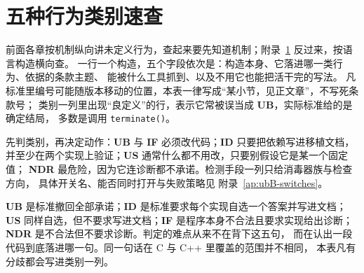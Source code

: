 \documentclass[12pt,a4paper,fontset=fandol]{ctexbook}
\newcommand{\Fn}[1]{\texttt{#1()}}
\newcommand{\Lang}[1]{\textsf{#1}}
\newcommand{\CL}{\Lang{C}}
\newcommand{\CPP}{\Lang{C++}}
\newcommand{\UB}{\textbf{\textsf{UB}}}
\newcommand{\IDB}{\textbf{\textsf{ID}}}
\newcommand{\USB}{\textbf{\textsf{US}}}
\newcommand{\NDR}{\textbf{\textsf{NDR}}}
\newcommand{\ILLF}{\textbf{\textsf{IF}}}
\begin{document}
\appendix
\chapter{五种行为类别速查}\label{ap:ubA-kinds}

前面各章按机制纵向讲未定义行为，查起来要先知道机制；附录~\ref{ap:ubA-kinds} 反过来，按语言构造横向查。
一行一个构造，五个字段依次是：构造本身、它落进哪一类行为、依据的条款主题、
能被什么工具抓到、以及不用它也能把活干完的写法。
凡标准里编号可能随版本移动的位置，本表一律写成“某小节，见正文章”，不写死条款号；
类别一列里出现“良定义”的行，表示它常被误当成 \UB{}，实际标准给的是确定结局，
多数是调用 \Fn{terminate}。

\begin{guideline}[title=这张表怎么用]
先判类别，再决定动作：\UB{} 与 \ILLF{} 必须改代码；\IDB{} 只要把依赖写进移植文档，
并至少在两个实现上验证；\USB{} 通常什么都不用改，只要别假设它是某一个固定值；
\NDR{} 最危险，因为它连诊断都不承诺。检测手段一列只给消毒器族与检查方向，
具体开关名、能否同时打开与失败策略见 附录~\ref{ap:ubB-switches}。
\end{guideline}

\begin{clause}[title=五个词的边界]
\UB{} 是标准撤回全部承诺；\IDB{} 是标准要求每个实现自选一个答案并写进文档；
\USB{} 同样自选，但不要求写进文档；\ILLF{} 是程序本身不合法且要求实现给出诊断；
\NDR{} 是不合法但不要求诊断。判定的难点从来不在背下这五句，
而在认出一段代码到底落进哪一句。同一句话在 \CL{} 与 \CPP{} 里覆盖的范围并不相同，
本表凡有分歧都会写进类别一列。
\end{clause}
\end{document}
